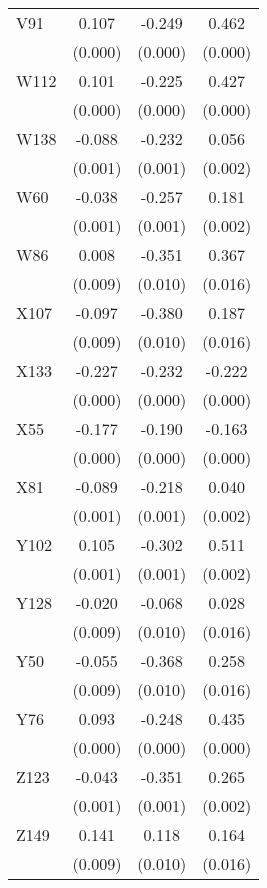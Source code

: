 \begin{table}[htbp]
\begin{tabular}{l*{3}{c}}
V91             &    0.107&   -0.249&    0.462\\
                &  (0.000)&  (0.000)&  (0.000)\\
W112            &    0.101&   -0.225&    0.427\\
                &  (0.000)&  (0.000)&  (0.000)\\
W138            &   -0.088&   -0.232&    0.056\\
                &  (0.001)&  (0.001)&  (0.002)\\
W60             &   -0.038&   -0.257&    0.181\\
                &  (0.001)&  (0.001)&  (0.002)\\
W86             &    0.008&   -0.351&    0.367\\
                &  (0.009)&  (0.010)&  (0.016)\\
X107            &   -0.097&   -0.380&    0.187\\
                &  (0.009)&  (0.010)&  (0.016)\\
X133            &   -0.227&   -0.232&   -0.222\\
                &  (0.000)&  (0.000)&  (0.000)\\
X55             &   -0.177&   -0.190&   -0.163\\
                &  (0.000)&  (0.000)&  (0.000)\\
X81             &   -0.089&   -0.218&    0.040\\
                &  (0.001)&  (0.001)&  (0.002)\\
Y102            &    0.105&   -0.302&    0.511\\
                &  (0.001)&  (0.001)&  (0.002)\\
Y128            &   -0.020&   -0.068&    0.028\\
                &  (0.009)&  (0.010)&  (0.016)\\
Y50             &   -0.055&   -0.368&    0.258\\
                &  (0.009)&  (0.010)&  (0.016)\\
Y76             &    0.093&   -0.248&    0.435\\
                &  (0.000)&  (0.000)&  (0.000)\\
Z123            &   -0.043&   -0.351&    0.265\\
                &  (0.001)&  (0.001)&  (0.002)\\
Z149            &    0.141&    0.118&    0.164\\
                &  (0.009)&  (0.010)&  (0.016)\\

\end{tabular}
\end{table}
